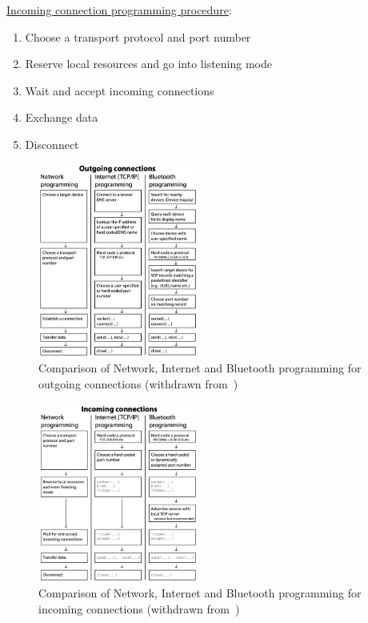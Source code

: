 \uline{Incoming connection programming procedure}:
\begin{enumerate}
\item Choose a transport protocol and port number
\item Reserve local resources and go into listening mode
\item Wait and accept incoming connections
\item Exchange data
\item Disconnect
\end{enumerate}
\begin{figure}[!hbt]
\centering
    \includegraphics[width=0.47\textwidth]{./img/bt-outgoing.png}
  \caption{Comparison of Network, Internet and Bluetooth programming for
    outgoing connections (withdrawn from~\cite{huang2007bluetooth})}%
\label{fig:bt-outgoing}
\end{figure}
%
%
\begin{figure}[!hbt]
\centering
    \includegraphics[width=0.47\textwidth]{./img/bt-incoming.png}
  \caption{Comparison of Network, Internet and Bluetooth programming for
    incoming connections (withdrawn from~\cite{huang2007bluetooth})}%
\label{fig:bt-incoming}
\end{figure}
%
